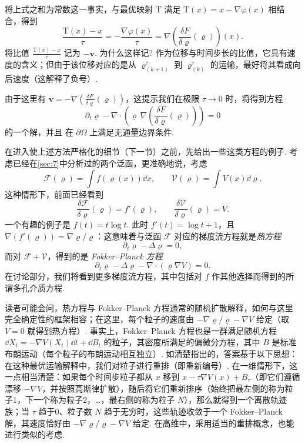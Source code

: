 将上式之和为常数这一事实，与最优映射 $\mathrm T$ 满足 $\mathrm T(x)=x-\nabla\varphi(x)$ 相结合，得到
\begin{equation}\label{eq:8.4}
\frac{\mathrm T(x)-x}{\tau}=-\frac{\nabla\varphi(x)}\tau
=\nabla\left(\frac{\delta F}{\delta\varrho}(\varrho)\right)(x).
\end{equation}
将比值 $\frac{\mathrm T(x)-x}\tau$ 记为 $-\mathbf v$. 为什么这样记? 作为位移与时间步长的比值，它具有速度的含义；但由于该位移对应的是从 $\varrho_{(k+1)}^\tau$ 到 $\varrho_{(k)}^\tau$ 的运输，最好将其看成向后速度（这解释了负号）.

由于这里有 $\mathbf v=-\nabla(\frac{\delta F}{\delta\varrho}(\varrho))$，这提示我们在极限 $\tau\to0$ 时，将得到方程
\[
\partial_t\varrho-\nabla\cdot\left(\varrho\,\nabla\left(\frac{\delta F}{\delta\varrho}(\varrho)\right)\right)=0
\]
的一个解，并且\label{idx:i110-p291}
在 $\partial\Omega$ 上满足无通量边界条件.

在进入使上述方法严格化的细节（下一节）之前，先给出一些这类方程的例子. 考虑已经在\autoref{sec:7}中分析过的两个泛函，更准确地说，考虑
\[
\mathscr F(\varrho)=\int f(\varrho(x))\dd x,
\qquad\mathscr V(\varrho)=\int V(x)\dd\varrho.
\]
这种情形下，前面已经看到
\[
\frac{\delta\mathscr F}{\delta\varrho}(\varrho)=f'(\varrho),
\qquad\frac{\delta\mathscr V}{\delta\varrho}(\varrho)=V.
\]
一个有趣的例子是 $f(t)=t\log t$. 此时 $f'(t)=\log t+1$，且 $\nabla(f'(\varrho))=\nabla\varrho/\varrho$：这意味着与泛函 $\mathscr F$ \label{idx:i75-p292}
对应的梯度流方程就是\emph{热方程}
\[
\partial_t\varrho-\Delta\varrho=0,
\]
而对 $\mathscr F+\mathscr V$，得到的是 \emph{Fokker--Planck 方程}
\[
\partial_t\varrho-\Delta\varrho-\nabla\cdot(\varrho\nabla V)=0.
\]
在讨论部分，我们将看到更多梯度流方程，其中包括对 $f$ 作其他选择而得到的所谓多孔介质方程.

\begin{remark}\label{obj:8.4}
读者可能会问，热方程与 Fokker--Planck 方程通常的随机扩散解释，如何与这里完全确定性的框架相容；在这里，每个粒子的速度由 $-\nabla\varrho/\varrho-\nabla V$ 给定（取 $V=0$ 就得到热方程）. 事实上，Fokker--Planck 方程也是一群满足随机方程 $\dd X_t=-\nabla V(X_t)\dd t+\dd B_t$ 的粒子，其密度所满足的偏微分方程，其中 $B$ 是标准布朗运动（每个粒子的布朗运动相互独立）. 如\cite{b88}清楚指出的，答案基于以下思想：在这种最优运输解释中，我们对粒子进行重排（即重新编号）. 在一维情形下，这一点相当清楚：如果每个时间步粒子都从 $x$ 移到 $x-\tau\nabla V(x)+B_\tau$（即它们遵循漂移 $-\nabla V$，并按照高斯律扩散），随后将它们重新排序（始终把最左侧的称为粒子1，下一个称为粒子2，\ldots，最右侧的称为粒子 $N$），那么就得到一个离散轨迹族；当 $\tau$ 趋于0、粒子数 $N$ 趋于无穷时，这些轨迹收敛于一个 Fokker--Planck 解，其速度恰好由 $-\nabla\varrho/\varrho-\nabla V$ 给定. 在高维中，采用适当的重排概念，也能进行类似的考虑.
\end{remark}


